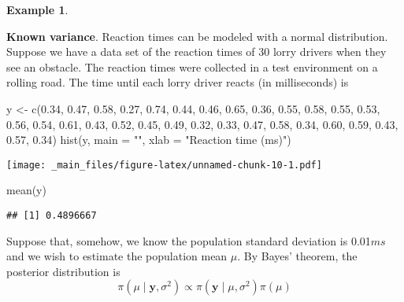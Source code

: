 \documentclass[
]{book}
\newenvironment{Shaded}{\begin{snugshade}}{\end{snugshade}}
\newcommand{\AttributeTok}[1]{\textcolor[rgb]{0.77,0.63,0.00}{#1}}
\newcommand{\FloatTok}[1]{\textcolor[rgb]{0.00,0.00,0.81}{#1}}
\newcommand{\FunctionTok}[1]{\textcolor[rgb]{0.00,0.00,0.00}{#1}}
\newcommand{\NormalTok}[1]{#1}
\newcommand{\OtherTok}[1]{\textcolor[rgb]{0.56,0.35,0.01}{#1}}
\newcommand{\StringTok}[1]{\textcolor[rgb]{0.31,0.60,0.02}{#1}}
\theoremstyle{definition}
\theoremstyle{definition}
\newtheorem{example}{Example}[chapter]
\theoremstyle{definition}
\theoremstyle{definition}
\theoremstyle{remark}
\begin{document}
\begin{example}
\protect\hypertarget{exm:normal}{}\label{exm:normal}

\textbf{Known variance}. Reaction times can be modeled with a normal distribution. Suppose we have a data set of the reaction times of 30 lorry drivers when they see an obstacle. The reaction times were collected in a test environment on a rolling road. The time until each lorry driver reacts (in milliseconds) is

\begin{Shaded}
\begin{Highlighting}[]
\NormalTok{y }\OtherTok{\textless{}{-}} \FunctionTok{c}\NormalTok{(}\FloatTok{0.34}\NormalTok{, }\FloatTok{0.47}\NormalTok{, }\FloatTok{0.58}\NormalTok{, }\FloatTok{0.27}\NormalTok{, }\FloatTok{0.74}\NormalTok{, }\FloatTok{0.44}\NormalTok{, }\FloatTok{0.46}\NormalTok{, }\FloatTok{0.65}\NormalTok{, }\FloatTok{0.36}\NormalTok{, }\FloatTok{0.55}\NormalTok{, }\FloatTok{0.58}\NormalTok{, }\FloatTok{0.55}\NormalTok{, }\FloatTok{0.53}\NormalTok{, }\FloatTok{0.56}\NormalTok{, }\FloatTok{0.54}\NormalTok{, }\FloatTok{0.61}\NormalTok{, }\FloatTok{0.43}\NormalTok{, }\FloatTok{0.52}\NormalTok{, }\FloatTok{0.45}\NormalTok{, }\FloatTok{0.49}\NormalTok{, }\FloatTok{0.32}\NormalTok{, }\FloatTok{0.33}\NormalTok{, }\FloatTok{0.47}\NormalTok{, }\FloatTok{0.58}\NormalTok{, }\FloatTok{0.34}\NormalTok{, }\FloatTok{0.60}\NormalTok{, }\FloatTok{0.59}\NormalTok{, }\FloatTok{0.43}\NormalTok{, }\FloatTok{0.57}\NormalTok{, }\FloatTok{0.34}\NormalTok{)}
\FunctionTok{hist}\NormalTok{(y, }\AttributeTok{main =} \StringTok{""}\NormalTok{, }\AttributeTok{xlab =} \StringTok{"Reaction time (ms)"}\NormalTok{)}
\end{Highlighting}
\end{Shaded}

\texttt{[image: \_main\_files/figure-latex/unnamed-chunk-10-1.pdf]}

\begin{Shaded}
\begin{Highlighting}[]
\FunctionTok{mean}\NormalTok{(y)}
\end{Highlighting}
\end{Shaded}

\begin{verbatim}
## [1] 0.4896667
\end{verbatim}

Suppose that, somehow, we know the population standard deviation is 0.01\(ms\) and we wish to estimate the population mean \(\mu\). By Bayes' theorem, the posterior distribution is
\[
\pi(\mu \mid \boldsymbol{y}, \sigma^2) \propto \pi(\boldsymbol{y} \mid \mu, \sigma^2) \pi(\mu)
\]


\end{example}
\end{document}
